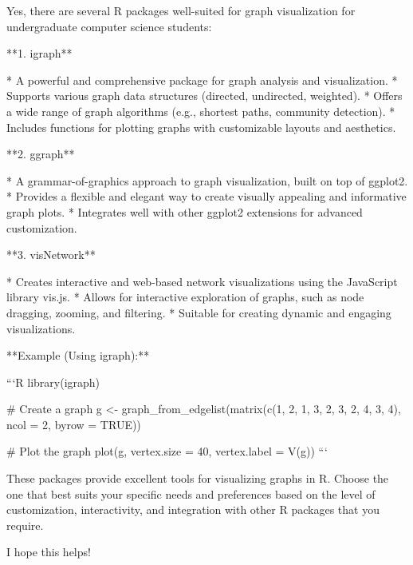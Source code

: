 Yes, there are several R packages well-suited for graph visualization for undergraduate computer science students:

**1. igraph**

*   A powerful and comprehensive package for graph analysis and visualization.
*   Supports various graph data structures (directed, undirected, weighted).
*   Offers a wide range of graph algorithms (e.g., shortest paths, community detection).
*   Includes functions for plotting graphs with customizable layouts and aesthetics.

**2. ggraph**

*   A grammar-of-graphics approach to graph visualization, built on top of ggplot2.
*   Provides a flexible and elegant way to create visually appealing and informative graph plots.
*   Integrates well with other ggplot2 extensions for advanced customization.

**3. visNetwork**

*   Creates interactive and web-based network visualizations using the JavaScript library vis.js.
*   Allows for interactive exploration of graphs, such as node dragging, zooming, and filtering.
*   Suitable for creating dynamic and engaging visualizations.

**Example (Using igraph):**

```R
library(igraph)

# Create a graph
g <- graph_from_edgelist(matrix(c(1, 2, 1, 3, 2, 3, 2, 4, 3, 4), ncol = 2, byrow = TRUE))

# Plot the graph
plot(g, vertex.size = 40, vertex.label = V(g)) 
```

These packages provide excellent tools for visualizing graphs in R. Choose the one that best suits your specific needs and preferences based on the level of customization, interactivity, and integration with other R packages that you require.

I hope this helps!
